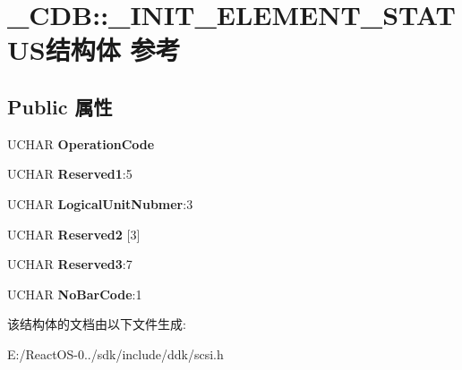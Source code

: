 \hypertarget{struct___c_d_b_1_1___i_n_i_t___e_l_e_m_e_n_t___s_t_a_t_u_s}{}\section{\+\_\+\+C\+DB\+:\+:\+\_\+\+I\+N\+I\+T\+\_\+\+E\+L\+E\+M\+E\+N\+T\+\_\+\+S\+T\+A\+T\+U\+S结构体 参考}
\label{struct___c_d_b_1_1___i_n_i_t___e_l_e_m_e_n_t___s_t_a_t_u_s}
\subsection*{Public 属性}
\begin{DoxyCompactItemize}
\item 
\mbox{\label{struct___c_d_b_1_1___i_n_i_t___e_l_e_m_e_n_t___s_t_a_t_u_s_acf8b5202916633feb86b9f2267bb446e}} 
U\+C\+H\+AR {\bfseries Operation\+Code}
\item 
\mbox{\label{struct___c_d_b_1_1___i_n_i_t___e_l_e_m_e_n_t___s_t_a_t_u_s_aa4e5a9147b91911945e0152eee22ec91}} 
U\+C\+H\+AR {\bfseries Reserved1}\+:5
\item 
\mbox{\label{struct___c_d_b_1_1___i_n_i_t___e_l_e_m_e_n_t___s_t_a_t_u_s_af660753521a35caec5ae19d2c63a8ced}} 
U\+C\+H\+AR {\bfseries Logical\+Unit\+Nubmer}\+:3
\item 
\mbox{\label{struct___c_d_b_1_1___i_n_i_t___e_l_e_m_e_n_t___s_t_a_t_u_s_a9e169c38c4cffed638e6ec27f4f6edd2}} 
U\+C\+H\+AR {\bfseries Reserved2} \mbox{[}3\mbox{]}
\item 
\mbox{\label{struct___c_d_b_1_1___i_n_i_t___e_l_e_m_e_n_t___s_t_a_t_u_s_a485c9a0dbeef7bc805d5d0de55079631}} 
U\+C\+H\+AR {\bfseries Reserved3}\+:7
\item 
\mbox{\label{struct___c_d_b_1_1___i_n_i_t___e_l_e_m_e_n_t___s_t_a_t_u_s_a82aeebc7f91b90ba32896de8b6c4818c}} 
U\+C\+H\+AR {\bfseries No\+Bar\+Code}\+:1
\end{DoxyCompactItemize}


该结构体的文档由以下文件生成\+:\begin{DoxyCompactItemize}
\item 
E\+:/\+React\+O\+S-\/0../sdk/include/ddk/scsi.\+h\end{DoxyCompactItemize}
